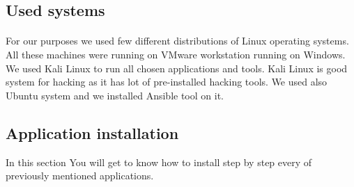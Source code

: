 \documentclass[12pt, a4paper]{article}
\begin{document}
\subsection{Used systems}
\paragraph{}For our purposes we used few different distributions of Linux operating systems. All these machines were running on VMware workstation running on Windows.\\
We used Kali Linux to run all chosen applications and tools. Kali Linux is good system for hacking as it has lot of pre-installed hacking tools. We used also Ubuntu system and we installed Ansible tool on it.

\subsection{Application installation}
In this section You will get to know how to install step by step every of previously mentioned applications.
\end{document}
